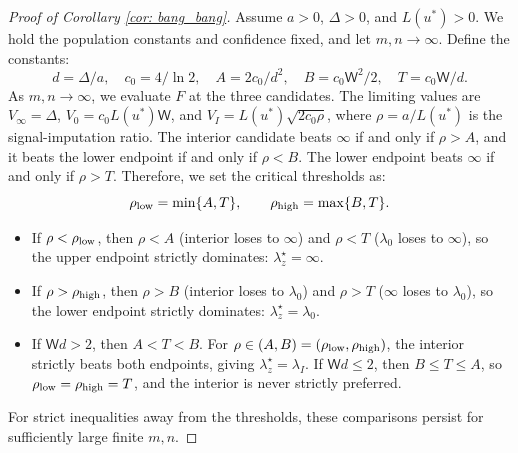  \begin{proof}[Proof of Corollary \ref{cor: bang_bang}]\label{proof:cor_bang_bang}
 Assume $a > 0$, $\Delta > 0$, and $L(u^*) > 0$. We hold the population constants and confidence fixed, and let $m, n \to \infty$. 
 Define the constants:
 \begin{equation*}
     d = \Delta / a, \quad c_0 = 4/\ln 2, \quad A = 2c_0/d^2, \quad B = c_0 \mathsf{W}^2/2, \quad T = c_0 \mathsf{W} / d.
 \end{equation*}
 As $m, n \to \infty$, we evaluate $F$ at the three candidates. The limiting values are $V_\infty = \Delta$, $V_0 = c_0 L(u^*) \mathsf{W}$, and $V_I = L(u^*) \sqrt{2c_0 \rho}$, where $\rho = a/L(u^*)$ is the signal-imputation ratio.
 The interior candidate beats $\infty$ if and only if $\rho > A$, and it beats the lower endpoint if and only if $\rho < B$. The lower endpoint beats $\infty$ if and only if $\rho > T$.
 Therefore, we set the critical thresholds as:
 \begin{equation*}
     \rho_{\rm low} = \min\{A, T\}, \qquad \rho_{\rm high} = \max\{B, T\}.
 \end{equation*}
 \begin{itemize}
     \item If $\rho < \rho_{\rm low}$, then $\rho < A$ (interior loses to $\infty$) and $\rho < T$ ($\lambda_0$ loses to $\infty$), so the upper endpoint strictly dominates: $\lambda_z^\star = \infty$.
     \item If $\rho > \rho_{\rm high}$, then $\rho > B$ (interior loses to $\lambda_0$) and $\rho > T$ ($\infty$ loses to $\lambda_0$), so the lower endpoint strictly dominates: $\lambda_z^\star = \lambda_0$.
     \item If $\mathsf{W}d > 2$, then $A < T < B$. For $\rho \in (A, B) = (\rho_{\rm low}, \rho_{\rm high})$, the interior strictly beats both endpoints, giving $\lambda_z^\star = \lambda_I$. If $\mathsf{W}d \le 2$, then $B \le T \le A$, so $\rho_{\rm low} = \rho_{\rm high} = T$, and the interior is never strictly preferred.
 \end{itemize}
 For strict inequalities away from the thresholds, these comparisons persist for sufficiently large finite $m, n$.
 \end{proof}
